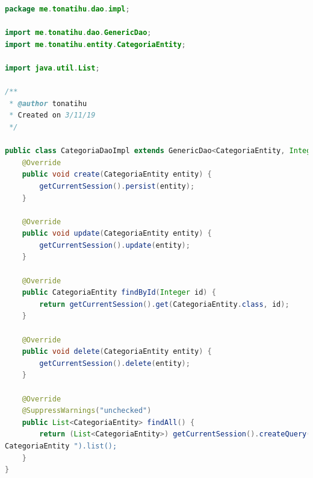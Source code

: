 \documentclass[a4paper,12pt]{article}
\begin{document}
\begin{lstlisting}[language=Java, style=customJava, 
caption={CategoriaDaoImpl.java}, 
captionpos=b,basicstyle=\fontfamily{cmss}\small]
package me.tonatihu.dao.impl;

import me.tonatihu.dao.GenericDao;
import me.tonatihu.entity.CategoriaEntity;

import java.util.List;

/**
 * @author tonatihu
 * Created on 3/11/19
 */

public class CategoriaDaoImpl extends GenericDao<CategoriaEntity, Integer> {
    @Override
    public void create(CategoriaEntity entity) {
        getCurrentSession().persist(entity);
    }

    @Override
    public void update(CategoriaEntity entity) {
        getCurrentSession().update(entity);
    }

    @Override
    public CategoriaEntity findById(Integer id) {
        return getCurrentSession().get(CategoriaEntity.class, id);
    }

    @Override
    public void delete(CategoriaEntity entity) {
        getCurrentSession().delete(entity);
    }

    @Override
    @SuppressWarnings("unchecked")
    public List<CategoriaEntity> findAll() {
        return (List<CategoriaEntity>) getCurrentSession().createQuery("from 
CategoriaEntity ").list();
    }
}
\end{lstlisting}
\end{document}
